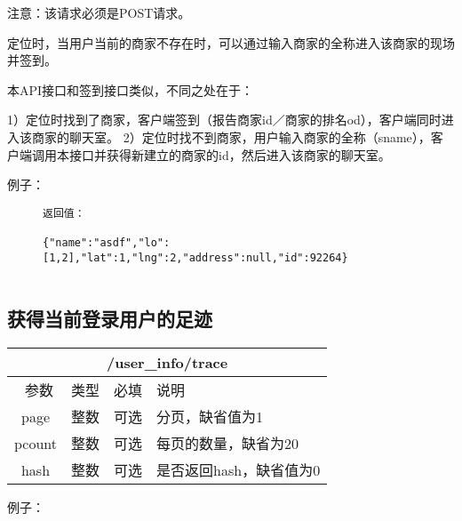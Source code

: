 \documentclass[cs4size]{ctexartutf8}
\begin{document}
注意：该请求必须是POST请求。

定位时，当用户当前的商家不存在时，可以通过输入商家的全称进入该商家的现场并签到。

本API接口和签到接口类似，不同之处在于：

1）定位时找到了商家，客户端签到（报告商家id／商家的排名od），客户端同时进入该商家的聊天室。
2）定位时找不到商家，用户输入商家的全称（sname），客户端调用本接口并获得新建立的商家的id，然后进入该商家的聊天室。


例子：

\begin{figure}[H]
\begin{verbatim}
返回值：

{"name":"asdf","lo":[1,2],"lat":1,"lng":2,"address":null,"id":92264}


\end{verbatim}
\end{figure}



\subsection{获得当前登录用户的足迹}

\begin{table}[H]
   \begin{center}
\begin{tabular}{|c|c|c|p{12cm}|}
\hline
\multicolumn{4}{|c|}{/user\_info/trace} \\
\hline\hline
 \  参数  & 类型 & 必填 &  说明  \\
   \hline
 page  & 整数 & 可选 & 分页，缺省值为1\\ 
 \hline
 pcount  & 整数 & 可选 & 每页的数量，缺省为20\\ 
  \hline
 hash  & 整数 & 可选 & 是否返回hash，缺省值为0\\
 \hline
\end{tabular}
   \end{center}
\end{table}

例子：
\end{document}

